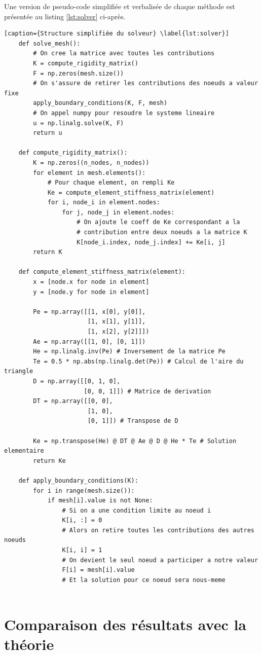 \documentclass{article}
\begin{document}
Une version de pseudo-code simplifiée et verbalisée de chaque méthode 
est présentée au listing \ref{lst:solver} ci-après.

\newpage

\begin{lstlisting}[caption={Structure simplifiée du solveur} \label{lst:solver}]
    def solve_mesh():
        # On cree la matrice avec toutes les contributions
        K = compute_rigidity_matrix()
        F = np.zeros(mesh.size())
        # On s'assure de retirer les contributions des noeuds a valeur fixe
        apply_boundary_conditions(K, F, mesh)
        # On appel numpy pour resoudre le systeme lineaire
        u = np.linalg.solve(K, F)
        return u
    
    def compute_rigidity_matrix():
        K = np.zeros((n_nodes, n_nodes))
        for element in mesh.elements():
            # Pour chaque element, on rempli Ke
            Ke = compute_element_stiffness_matrix(element)
            for i, node_i in element.nodes:
                for j, node_j in element.nodes:
                    # On ajoute le coeff de Ke correspondant a la
                    # contribution entre deux noeuds a la matrice K
                    K[node_i.index, node_j.index] += Ke[i, j]
        return K
    
    def compute_element_stiffness_matrix(element):
        x = [node.x for node in element]
        y = [node.y for node in element]

        Pe = np.array([[1, x[0], y[0]],
                       [1, x[1], y[1]],
                       [1, x[2], y[2]]])
        Ae = np.array([[1, 0], [0, 1]])
        He = np.linalg.inv(Pe) # Inversement de la matrice Pe
        Te = 0.5 * np.abs(np.linalg.det(Pe)) # Calcul de l'aire du triangle
        D = np.array([[0, 1, 0],
                      [0, 0, 1]]) # Matrice de derivation
        DT = np.array([[0, 0],
                       [1, 0],
                       [0, 1]]) # Transpose de D

        Ke = np.transpose(He) @ DT @ Ae @ D @ He * Te # Solution elementaire
        return Ke

    def apply_boundary_conditions(K):
        for i in range(mesh.size()):
            if mesh[i].value is not None:
                # Si on a une condition limite au noeud i
                K[i, :] = 0
                # Alors on retire toutes les contributions des autres noeuds
                K[i, i] = 1
                # On devient le seul noeud a participer a notre valeur
                F[i] = mesh[i].value
                # Et la solution pour ce noeud sera nous-meme
    
    \end{lstlisting}

\newpage

\section{Comparaison des résultats avec la théorie}
\end{document}
